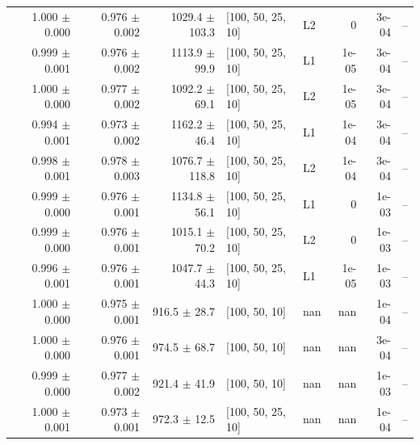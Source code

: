 \documentclass[reprint,english,notitlepage, floatfix]{revtex4-2}  %
\begin{document}
\begin{longtable}{r r r l l r r l}
\rowcolor{Cluster4} 1.000 $\pm$ 0.000 & 0.976 $\pm$ 0.002 & 1029.4 $\pm$ 103.3 & [100, 50, 25, 10] & L2 & 0 & 3e-04 & -- \\
\rowcolor{Cluster4} 0.999 $\pm$ 0.001 & 0.976 $\pm$ 0.002 & 1113.9 $\pm$ 99.9 & [100, 50, 25, 10] & L1 & 1e-05 & 3e-04 & -- \\
\rowcolor{Cluster4} 1.000 $\pm$ 0.000 & 0.977 $\pm$ 0.002 & 1092.2 $\pm$ 69.1 & [100, 50, 25, 10] & L2 & 1e-05 & 3e-04 & -- \\
\rowcolor{Cluster4} 0.994 $\pm$ 0.001 & 0.973 $\pm$ 0.002 & 1162.2 $\pm$ 46.4 & [100, 50, 25, 10] & L1 & 1e-04 & 3e-04 & -- \\
\rowcolor{Cluster4} 0.998 $\pm$ 0.001 & 0.978 $\pm$ 0.003 & 1076.7 $\pm$ 118.8 & [100, 50, 25, 10] & L2 & 1e-04 & 3e-04 & -- \\
\rowcolor{Cluster4} 0.999 $\pm$ 0.000 & 0.976 $\pm$ 0.001 & 1134.8 $\pm$ 56.1 & [100, 50, 25, 10] & L1 & 0 & 1e-03 & -- \\
\rowcolor{Cluster4} 0.999 $\pm$ 0.000 & 0.976 $\pm$ 0.001 & 1015.1 $\pm$ 70.2 & [100, 50, 25, 10] & L2 & 0 & 1e-03 & -- \\
\rowcolor{Cluster4} 0.996 $\pm$ 0.001 & 0.976 $\pm$ 0.001 & 1047.7 $\pm$ 44.3 & [100, 50, 25, 10] & L1 & 1e-05 & 1e-03 & -- \\
\rowcolor{Cluster4} 1.000 $\pm$ 0.000 & 0.975 $\pm$ 0.001 & 916.5 $\pm$ 28.7 & [100, 50, 10] & nan & nan & 1e-04 & -- \\
\rowcolor{Cluster4} 1.000 $\pm$ 0.000 & 0.976 $\pm$ 0.001 & 974.5 $\pm$ 68.7 & [100, 50, 10] & nan & nan & 3e-04 & -- \\
\rowcolor{Cluster4} 0.999 $\pm$ 0.000 & 0.977 $\pm$ 0.002 & 921.4 $\pm$ 41.9 & [100, 50, 10] & nan & nan & 1e-03 & -- \\
\rowcolor{Cluster4} 1.000 $\pm$ 0.001 & 0.973 $\pm$ 0.001 & 972.3 $\pm$ 12.5 & [100, 50, 25, 10] & nan & nan & 1e-04 & -- \label{apdx:tab:_part_e_models}
\end{longtable}
\end{document}

